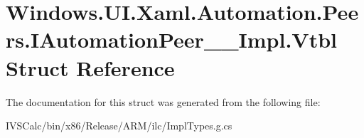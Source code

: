 \hypertarget{struct_windows_1_1_u_i_1_1_xaml_1_1_automation_1_1_peers_1_1_i_automation_peer_____impl_1_1_vtbl}{}\section{Windows.\+U\+I.\+Xaml.\+Automation.\+Peers.\+I\+Automation\+Peer\+\_\+\+\_\+\+Impl.\+Vtbl Struct Reference}
\label{struct_windows_1_1_u_i_1_1_xaml_1_1_automation_1_1_peers_1_1_i_automation_peer_____impl_1_1_vtbl}


The documentation for this struct was generated from the following file\+:\begin{DoxyCompactItemize}
\item 
I\+V\+S\+Calc/bin/x86/\+Release/\+A\+R\+M/ilc/Impl\+Types.\+g.\+cs\end{DoxyCompactItemize}
